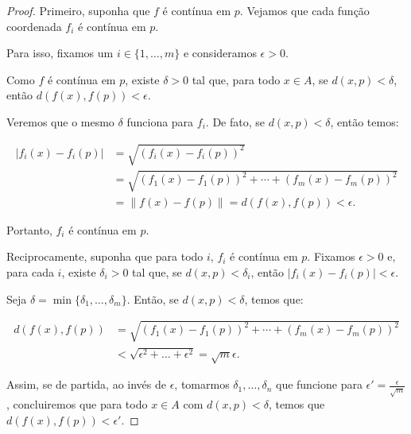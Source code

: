 \begin{proof}
    Primeiro, suponha que $f$ é contínua em $p$.
    Vejamos que cada função coordenada $f_i$ é contínua em $p$.
    
    Para isso, fixamos um $i \in \{1, \dots, m\}$ e consideramos $\epsilon>0$.

    Como $f$ é contínua em $p$, existe $\delta>0$ tal que, para todo $x \in A$, se $d(x, p) < \delta$, então $d(f(x), f(p)) < \epsilon$.

    Veremos que o mesmo $\delta$ funciona para $f_i$.
    De fato, se $d(x, p) < \delta$, então temos:

    \begin{align*}
        |f_i(x) - f_i(p)| &= \sqrt{(f_i(x) - f_i(p))^2} \\
        &= \sqrt{(f_1(x) - f_1(p))^2 + \cdots + (f_m(x) - f_m(p))^2} \\
        &= \|f(x) - f(p)\| = d(f(x), f(p)) < \epsilon.
    \end{align*}

    Portanto, $f_i$ é contínua em $p$.

    Reciprocamente, suponha que para todo $i$, $f_i$ é contínua em $p$.
    Fixamos $\epsilon>0$ e, para cada $i$, existe $\delta_i>0$ tal que, se $d(x, p) < \delta_i$, então $|f_i(x) - f_i(p)| < \epsilon$.

    Seja $\delta = \min\{\delta_1, \ldots, \delta_m\}$. Então, se $d(x, p) < \delta$, temos que:

    \begin{align*}
        d(f(x), f(p)) &= \sqrt{(f_1(x) - f_1(p))^2 + \cdots + (f_m(x) - f_m(p))^2} \\
        &< \sqrt{\epsilon^2+\dots+\epsilon^2}= \sqrt{m}\epsilon.
    \end{align*}

    Assim, se de partida, ao invés de $\epsilon$, tomarmos $\delta_1, \dots, \delta_n$ que funcione para $\epsilon'=\frac{\epsilon}{\sqrt{m}}$, concluiremos que para todo $x \in A$ com $d(x, p) < \delta$, temos que $d(f(x), f(p)) < \epsilon'$.
\end{proof}